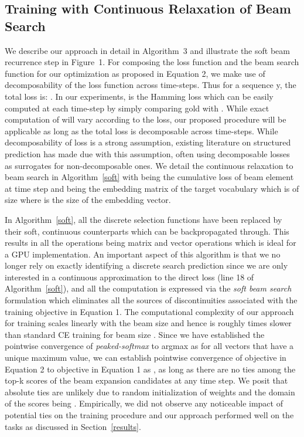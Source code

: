 \documentclass[letterpaper]{article} \usepackage{aaai18}  \usepackage{times}  \usepackage{helvet}  \usepackage{courier}  \usepackage{url}  \usepackage{graphicx}  \frenchspacing
\begin{document}
\subsection{Training with Continuous Relaxation of Beam Search \label{sec-soft-beam}}
We describe our approach in detail in Algorithm~3 and illustrate the soft beam recurrence step in Figure~1. For composing the loss function and the beam search function for our optimization as proposed in Equation 2, we make use of decomposability of the loss function across time-steps. Thus for a sequence y, the total loss is: . In our experiments,  is the Hamming loss which can be easily computed at each time-step by simply comparing gold  with . While exact computation of  will vary according to the loss, our proposed procedure will be applicable as long as the total loss is decomposable across time-steps. While decomposability of loss is a strong assumption, existing literature on structured prediction \cite{taskar2004max,tsochantaridis2005large} has made due with this assumption, often using decomposable losses as surrogates for non-decomposable ones. We detail the continuous relaxation to beam search in Algorithm~\ref{soft} with  being the cumulative loss of beam element  at time step  and  being the embedding matrix of the target vocabulary which is of size  where  is the size of the embedding vector.

In Algorithm~\ref{soft}, all the discrete selection functions have been replaced by their soft, continuous counterparts which can be backpropagated through. This results in all the operations being matrix and vector operations which is ideal for a GPU implementation. An important aspect of this algorithm is that we no longer rely on exactly identifying a discrete search prediction  since we are only interested in a continuous approximation to the direct loss  (line 18 of Algorithm~\ref{soft}), and all the computation is expressed via the \emph{soft beam search} formulation which eliminates all the sources of discontinuities associated with the training objective in Equation 1. The computational complexity of our approach for training scales linearly with the beam size and hence is roughly  times slower than standard CE training for beam size .
Since we have established the pointwise convergence of \emph{peaked-softmax} to argmax as  for all vectors that have a unique maximum value, we can establish pointwise convergence of objective in Equation 2 to objective in Equation 1 as , as long as there are no ties among the top-k scores of the beam expansion candidates at any time step. We posit that absolute ties are unlikely due to random initialization of weights and the domain of the scores being . Empirically, we did not observe any noticeable impact of potential ties on the training procedure and our approach performed well on the tasks as discussed in Section~\ref{results}.
\end{document}

